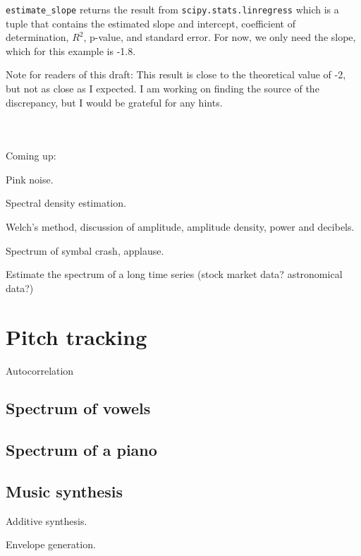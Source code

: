 \documentclass[12pt]{book}
\begin{document}
\verb"estimate_slope" returns the
result from {\tt scipy.stats.linregress} which is a tuple that
contains the estimated slope and intercept, coefficient of
determination, $R^2$, p-value, and standard error.  For now,
we only need the slope, which for this example is -1.8.

Note for readers of this draft: This result is close to the
theoretical value of -2, but not as close as I expected.  I am
working on finding the source of the discrepancy, but I would be
grateful for any hints.


\begin{verbatim}
\end{verbatim}

\begin{verbatim}
\end{verbatim}

\begin{verbatim}
\end{verbatim}


Coming up:

Pink noise.

Spectral density estimation.

Welch's method, discussion of amplitude, amplitude density, power
and decibels.

Spectrum of symbal crash, applause.

Estimate the spectrum of a long time series (stock market data?
astronomical data?)


\chapter{Pitch tracking}

Autocorrelation

\section{Spectrum of vowels}

\section{Spectrum of a piano}

\section{Music synthesis}

Additive synthesis.

Envelope generation.
\end{document}
